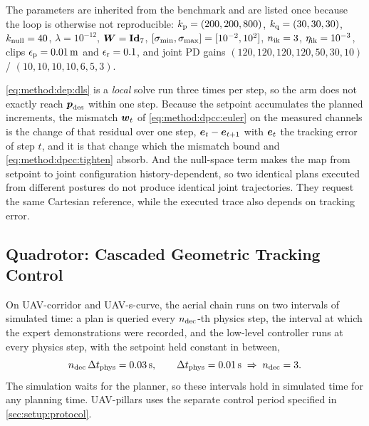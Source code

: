 The parameters are inherited from the benchmark and are listed once because the loop is otherwise
not reproducible: $k_{\textrm{p}} = (200,200,800)$, $k_{\textrm{q}} = (30,30,30)$, $k_{\textrm{null}} = 40$,
$\lambda = 10^{-12}$, $\boldsymbol{W} = \textbf{Id}_{7}$, $[\sigma_{\textrm{min}},\sigma_{\textrm{max}}] = [10^{-2},10^{2}]$,
$n_{\textrm{ik}} = 3$, $\eta_{\textrm{ik}} = 10^{-3}$, clips $\epsilon_{\textrm{p}} = 0.01\,\textrm{m}$ and
$\epsilon_{\textrm{r}} = 0.1$, and joint PD gains
$(120,120,120,120,50,30,10)$ / $(10,10,10,10,6,5,3)$.

\eqref{eq:method:dep:dls} is a \emph{local} solve run three
times per step, so the arm does not exactly reach $\boldsymbol{p}_{\textrm{des}}$ within one step. Because the setpoint
accumulates the planned increments, the mismatch $\boldsymbol{w}_{t}$ of \eqref{eq:method:dpcc:euler} on the measured
channels is the change of that residual over one step, $\boldsymbol{e}_{t}-\boldsymbol{e}_{t+1}$ with $\boldsymbol{e}_{t}$ the
tracking error of step $t$, and it is that change which the mismatch bound and \eqref{eq:method:dpcc:tighten}
absorb. And the null-space term makes the map from setpoint to
joint configuration history-dependent, so two identical plans executed from different postures do not
produce identical joint trajectories. They request the same Cartesian reference, while the executed
trace also depends on tracking error.

\subsection{Quadrotor: Cascaded Geometric Tracking Control}\label{sec:method:geometric}

On UAV-corridor and UAV-s-curve, the aerial chain runs on two intervals of simulated time: a plan is queried every $n_{\textrm{dec}}$-th physics step, the interval at which the expert
demonstrations were recorded, and the low-level controller runs at every physics step, with the
setpoint held constant in between,
\begin{equation}\label{eq:method:dep:multirate}
  n_{\textrm{dec}}\,\Delta t_{\textrm{phys}} = 0.03\,\textrm{s},
  \qquad
  \Delta t_{\textrm{phys}} = 0.01\,\textrm{s}
  \;\Rightarrow\; n_{\textrm{dec}} = 3 .
\end{equation}
The simulation waits for the planner, so these intervals hold in simulated time for any planning
time. UAV-pillars uses the separate control period specified in \autoref{sec:setup:protocol}.

